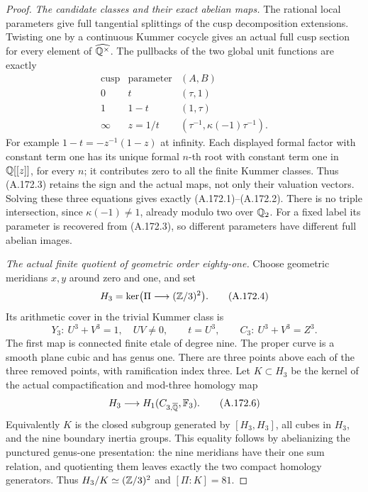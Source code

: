 \begin{proof}
\emph{The candidate classes and their exact abelian maps.}
The rational local parameters give full tangential splittings of
the cusp decomposition extensions.  Twisting one by a continuous
Kummer cocycle gives an actual full cusp section for every element
of \(\widehat{\mathbb Q^\times}\).  The pullbacks of the two
global unit functions are exactly
\[
 \begin{array}{c|c|c}
 \text{cusp}&\text{parameter}&(A,B)\\\hline
 0&t&(\tau,1)\\
 1&1-t&(1,\tau)\\
 \infty&z=1/t&(\tau^{-1},\kappa(-1)\tau^{-1}).
 \end{array}
\tag{A.172.3}
\]
For example \(1-t=-z^{-1}(1-z)\) at infinity.  Each displayed
formal factor with constant term one has its unique formal
\(n\)-th root with constant term one in \(\mathbb Q[[z]]\), for
every \(n\); it contributes zero to all the finite Kummer
classes.  Thus (A.172.3) retains the sign and the actual maps,
not only their valuation vectors.  Solving these three equations
gives exactly (A.172.1)--(A.172.2).  There is no triple
intersection, since \(\kappa(-1)\ne1\), already modulo two
over \(\mathbb Q_2\).  For a fixed label its parameter is recovered
from (A.172.3), so different parameters have different full
abelian images.

\emph{The actual finite quotient of geometric order eighty-one.}
Choose geometric meridians \(x,y\) around zero and one, and set
\[
 H_3=\ker\bigl(\Pi\longrightarrow(\mathbb Z/3)^2\bigr).
\tag{A.172.4}
\]
Its arithmetic cover in the trivial Kummer class is
\[
       Y_3:\ U^3+V^3=1,\quad UV\ne0,
                 \qquad t=U^3,
       \qquad C_3:\ U^3+V^3=Z^3.
\tag{A.172.5}
\]
The first map is connected finite etale of degree nine.  The
proper curve is a smooth plane cubic and has genus one.  There
are three points above each of the three removed points, with
ramification index three.
Let \(K\subset H_3\) be the kernel of the actual
compactification and mod-three homology map
\[
         H_3\longrightarrow H_1(C_{3,\overline{\mathbb Q}},\mathbb F_3).
\tag{A.172.6}
\]
Equivalently \(K\) is the closed subgroup generated by
\([H_3,H_3]\), all cubes in \(H_3\), and the nine boundary
inertia groups.  This equality follows by abelianizing the
punctured genus-one presentation: the nine meridians have their
one sum relation, and quotienting them leaves exactly the two
compact homology generators.  Thus \(H_3/K\simeq(\mathbb Z/3)^2\)
and \([\Pi:K]=81\).


\end{proof}
